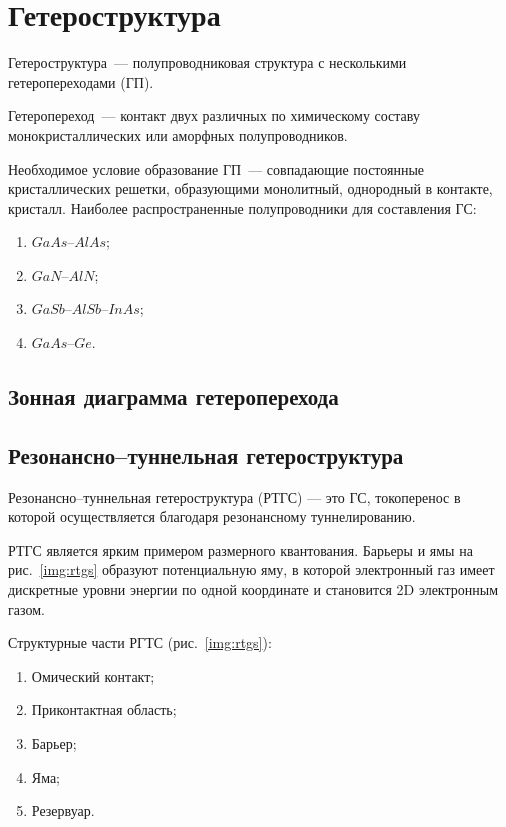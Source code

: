 \section{Гетероструктура}
Гетероструктура~--- полупроводниковая структура с несколькими гетеропереходами (ГП). 


Гетеропереход~--- контакт двух различных по химическому составу монокристаллических или аморфных полупроводников.

Необходимое условие образование ГП~--- совпадающие постоянные кристаллических решетки, образующими монолитный, однородный в контакте, кристалл.
Наиболее распространенные полупроводники для составления ГС:
\begin{enumerate}
  \item $GaAs$--$AlAs$;
  \item $GaN$--$AlN$;
  \item $GaSb$--$AlSb$--$InAs$;
  \item $GaAs$--$Ge$.
\end{enumerate}

\subsection{Зонная диаграмма гетероперехода}


\subsection{Резонансно--туннельная гетероструктура}
Резонансно--туннельная гетероструктура (РТГС) --- это ГС, токоперенос в которой осуществляется благодаря резонансному туннелированию.

РТГС является ярким примером размерного квантования. Барьеры и ямы на рис.~\ref{img:rtgs} образуют потенциальную яму, в которой электронный газ имеет дискретные уровни энергии по одной координате и становится 2D электронным газом.

Структурные части РГТС (рис.~\ref{img:rtgs}):
\begin{enumerate}
  \item Омический контакт;
  \item Приконтактная область;
  \item Барьер;
  \item Яма;
  \item Резервуар.
\end{enumerate}

